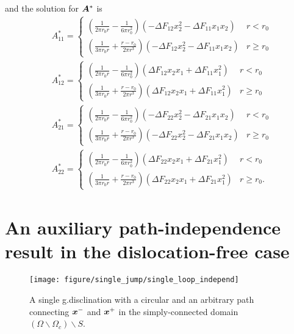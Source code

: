 \documentclass[11pt,letterpaper]{article}
\begin{document}
and the solution for $\bfA^*$ is 
\begin{eqnarray*}
&A^*_{11}  = 
\begin{cases}
 (\frac{1}{2\pi r_0 r}- \frac{1}{6 \pi r_0^2}) (-\Delta F_{12} x_2^2-\Delta F_{11} x_1 x_2) &r < r_0 \\
(\frac{1}{3\pi r_0 r}+\frac{r-r_0}{2\pi r^3})(-\Delta F_{12} x_2^2 - \Delta F_{11} x_1 x_2) & r \ge r_0
\end{cases}
\\
&A^*_{12}  = 
\begin{cases}
 (\frac{1}{2\pi r_0 r}- \frac{1}{6 \pi r_0^2}) (\Delta F_{12} x_2 x_1 + \Delta F_{11} x_1^2) &r < r_0 \\
(\frac{1}{3\pi r_0 r}+\frac{r-r_0}{2\pi r^3})(\Delta F_{12} x_2 x_1 + \Delta F_{11} x_1^2) & r \ge r_0
\end{cases}
\\
&A^*_{21}  = 
\begin{cases}
 (\frac{1}{2\pi r_0 r}- \frac{1}{6 \pi r_0^2}) (-\Delta F_{22} x_2^2-\Delta F_{21} x_1 x_2) &r < r_0 \\
(\frac{1}{3\pi r_0 r}+\frac{r-r_0}{2\pi r^3})(-\Delta F_{22} x_2^2 - \Delta F_{21} x_1 x_2) & r \ge r_0
\end{cases}
\\
&A^*_{22}  = 
\begin{cases}
 (\frac{1}{2\pi r_0 r}- \frac{1}{6 \pi r_0^2}) (\Delta F_{22} x_2 x_1 + \Delta F_{21} x_1^2) &r < r_0 \\
(\frac{1}{3\pi r_0 r}+\frac{r-r_0}{2\pi r^3})(\Delta F_{22} x_2 x_1 + \Delta F_{21} x_1^2) & r \ge r_0.
\end{cases}
\end{eqnarray*}

\section{An auxiliary path-independence result in the dislocation-free case}\label{sec:append_loop_independ}


\begin{figure}
\centering
\texttt{[image: figure/single\_jump/single\_loop\_independ]}
\caption{A single g.disclination with a circular and an arbitrary path connecting $\bfx^-$ and $\bfx^+$ in the simply-connected domain $(\Omega\backslash\Omega_c)\backslash S$.}
\label{fig:appen_loop_indep}
\end{figure}
\end{document}
